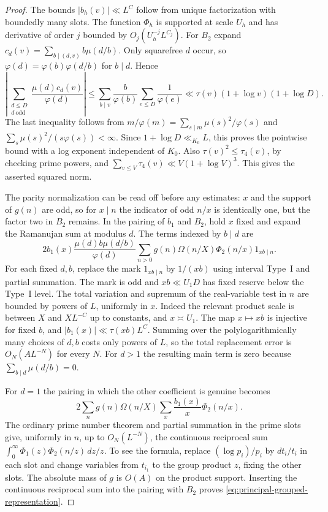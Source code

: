\documentclass[11pt,a4paper]{article}
\theoremstyle{paperplain}
\numberwithin{equation}{section}
\begin{document}
\begin{proof}
The bounds $|b_h(v)|\ll L^C$ follow from unique factorization
with boundedly many slots. The function $\Phi_h$ is supported at
scale $U_h$ and has derivative of order $j$ bounded by
$O_j(U_h^{-j}L^{C_j})$. For $B_2$ expand
$c_d(v)=\sum_{b\mid(d,v)}b\mu(d/b)$. Only squarefree $d$ occur,
so $\varphi(d)=\varphi(b)\varphi(d/b)$ for $b\mid d$. Hence
\[
 \left|\sum_{\substack{d\le D\\ d\ \mathrm{odd}}}
            \frac{\mu(d)c_d(v)}{\varphi(d)}\right|
 \le \sum_{b\mid v}\frac{b}{\varphi(b)}\sum_{e\le D}\frac1{\varphi(e)}
 \ll \tau(v)(1+\log v)(1+\log D).
\]
The last inequality follows from
$m/\varphi(m)=\sum_{s\mid m}\mu(s)^2/\varphi(s)$ and
$\sum_s\mu(s)^2/(s\varphi(s))<\infty$. Since
$1+\log D\ll_{K_0}L$, this proves the pointwise bound with a log
exponent independent of $K_0$. Also $\tau(v)^2\le\tau_4(v)$, by
checking prime powers, and $\sum_{v\le V}\tau_4(v)\ll V(1+\log V)^3$.
This gives the asserted squared norm.

The parity normalization can be read off before any estimates: $x$ and
the support of $g(n)$ are odd, so for $x\mid n$ the indicator of odd
$n/x$ is identically one, but the factor two in $B_2$ remains.
In the pairing of $b_1$ and $B_2$, hold $x$ fixed and expand the
Ramanujan sum at modulus $d$. The terms indexed by $b\mid d$ are
\[
 2b_1(x)\frac{\mu(d)b\mu(d/b)}{\varphi(d)}
     \sum_{n>0} g(n)\Omega(n/X)\Phi_2(n/x)1_{xb\mid n}.
\]
For each fixed $d,b$, replace the mark $1_{xb\mid n}$ by
$1/(xb)$ using interval Type~I and partial summation. The mark
is odd and $xb\ll U_1D$ has fixed reserve below the Type~I level.
The total variation and supremum of the real-variable test in $n$
are bounded by powers of $L$, uniformly in $x$. Indeed the relevant
product scale is between $X$ and $XL^{-C}$ up to constants, and
$x\asymp U_1$. The map $x\mapsto xb$ is injective for fixed $b$,
and $|b_1(x)|\ll\tau(xb)L^C$. Summing over the polylogarithmically
many choices of $d,b$ costs only powers of $L$, so the total
replacement error is $O_N(AL^{-N})$ for every $N$.
For $d>1$ the resulting main term is zero because
$\sum_{b\mid d}\mu(d/b)=0$.

For $d=1$ the pairing in which the other coefficient is genuine
becomes
\[
 2\sum_n g(n)\Omega(n/X)\sum_x \frac{b_1(x)}{x}\Phi_2(n/x).
\]
The ordinary prime number theorem and partial summation in the
prime slots give, uniformly in $n$, up to $O_N(L^{-N})$, the
continuous reciprocal sum
$\int_0^\infty\Phi_1(z)\Phi_2(n/z)\,dz/z$. To see the formula,
replace $(\log p_i)/p_i$ by $dt_i/t_i$ in each slot and change
variables from $t_{i_1}$ to the group product $z$, fixing the
other slots. The absolute mass of $g$ is $O(A)$ on the product
support. Inserting the continuous reciprocal sum into the pairing
with $B_2$ proves \eqref{eq:principal-grouped-representation}.


\end{proof}
\end{document}
